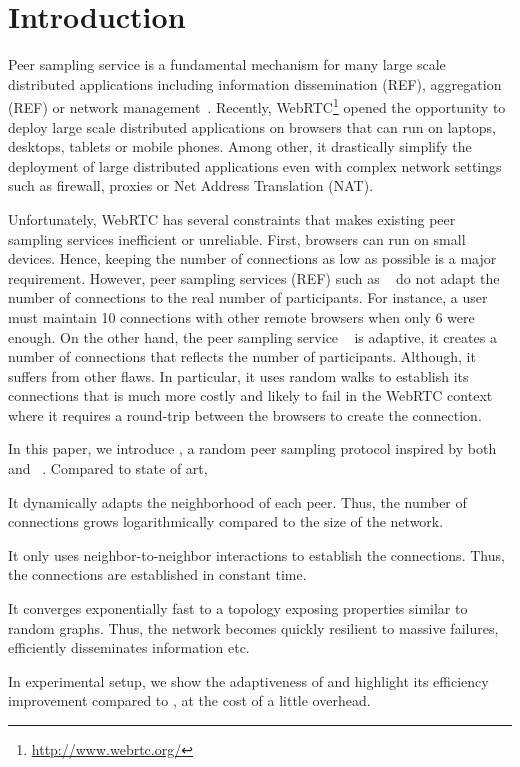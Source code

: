 
\section{Introduction}

Peer sampling service is a fundamental mechanism for many large scale
distributed applications including information dissemination (REF), aggregation
(REF) or network management~\cite{jelasity2007gossip}. Recently,
WebRTC\footnote{\url{http://www.webrtc.org/}} opened the opportunity to deploy large scale distributed
applications on browsers that can run on laptops, desktops, tablets or mobile
phones. Among other, it drastically simplify the deployment of large
distributed applications even with complex network settings such as firewall,
proxies or Net Address Translation (NAT).

Unfortunately, WebRTC has several constraints that makes existing peer sampling
services inefficient or unreliable. First, browsers can run on small
devices. Hence, keeping the number of connections as low as possible is a major
requirement. However, peer sampling services (REF) such as \CYCLON{}~\cite{
  voulgaris2005cyclon} do not adapt the number of connections to the real
number of participants. For instance, a user must maintain 10 connections with
other remote browsers when only 6 were enough. On the other hand, the peer
sampling service \SCAMP{}~\cite{ganesh2003peer} is adaptive, it creates a
number of connections that reflects the number of participants. Although, it
suffers from other flaws. In particular, it uses random walks to establish its
connections that is much more costly and likely to fail in the WebRTC context
where it requires a round-trip between the browsers to create the connection.

In this paper, we introduce \SCAMPLON{}, a random peer sampling protocol
inspired by both \SCAMP{}~\cite{ganesh2003peer} and
\CYCLON{}~\cite{voulgaris2005cyclon}. Compared to state of art,
\begin{inparaenum}[(i)]
\item It dynamically adapts the neighborhood of each peer. Thus, the number of
  connections grows logarithmically compared to the size of the network.
\item It only uses neighbor-to-neighbor interactions to establish the
  connections. Thus, the connections are established in constant time.
\item It converges exponentially fast to a topology exposing properties similar
  to random graphs. Thus, the network becomes quickly resilient to massive
  failures, efficiently disseminates information etc.
\item In experimental setup, we show the adaptiveness of \SCAMPLON{} and
  highlight its efficiency improvement compared to \CYCLON{}, at the cost of a
  little overhead.
\end{inparaenum}

